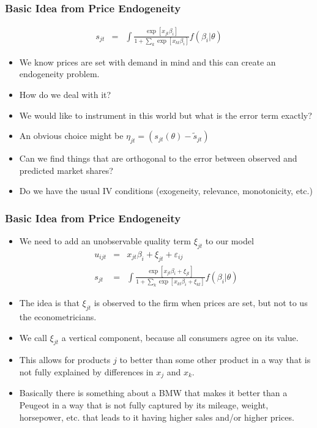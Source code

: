 \begin{frame}
\frametitle{Basic Idea from Price Endogeneity}
\begin{eqnarray*}
s_{jt} &=& \int \frac{\exp[x_{jt} \beta_i  ]}{1+\sum_k \exp[x_{kt} \beta_i ]} f(\beta_i | \theta)
\end{eqnarray*}
\begin{itemize}
\item We know prices are set with demand in mind and this can create an endogeneity problem.
\item How do we deal with it?
\item We would like to instrument in this world but what is the error term exactly?
\item An obvious choice might be $\eta_{jt} = (s_{jt}(\theta)-\tilde{s}_{jt} )$
\item Can we find things that are orthogonal to the error between observed and predicted market shares?
\item Do we have the usual IV conditions (exogeneity, relevance, monotonicity, etc.)
\end{itemize}
\end{frame}



\begin{frame}
\frametitle{Basic Idea from Price Endogeneity}
 \begin{itemize}
\item We need to add an unobservable quality term $\xi_{jt}$ to our model
\begin{eqnarray*}
u_{ijt} &=& x_{jt} \beta_i + \xi_{jt} +  \varepsilon_{ij} \\
s_{jt} &=& \int \frac{\exp[x_{jt} \beta_i + \xi_{jt} ]}{1+\sum_k \exp[x_{kt} \beta_i + \xi_{kt} ]} f(\beta_i | \theta)
\end{eqnarray*}
\item The idea is that $\xi_{jt}$ is observed to the firm when prices are set, but not to us the econometricians.
\item We call $\xi_{jt}$ a vertical component, because all consumers agree on its value.
\item This allows for products $j$ to better than some other product in a way that is not fully explained by differences in $x_j$ and $x_k$.
\item Basically there is something about a BMW that makes it better than a Peugeot in a way that is not fully captured by its mileage, weight, horsepower, etc. that leads to it having higher sales and/or higher prices.
 \end{itemize}
\end{frame}

